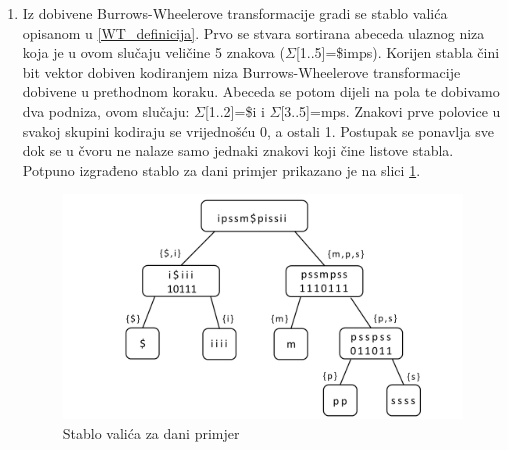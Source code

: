 \documentclass[a4paper,12pt]{article}
\begin{document}
\begin{enumerate}
	\item Iz dobivene Burrows-Wheelerove transformacije gradi se stablo valića opisanom u \ref{WT_definicija}. Prvo se stvara sortirana abeceda ulaznog niza koja je u ovom slučaju veličine 5 znakova ($\Sigma$[1..5]=\$imps). Korijen stabla čini bit vektor dobiven kodiranjem niza Burrows-Wheelerove transformacije dobivene u prethodnom koraku. Abeceda se potom dijeli na pola te dobivamo dva podniza, ovom slučaju: $\Sigma$[1..2]=\$i i $\Sigma$[3..5]=mps. Znakovi prve polovice u svakoj skupini kodiraju se vrijednošću 0, a ostali 1. Postupak se ponavlja sve dok se u čvoru ne nalaze samo jednaki znakovi koji čine listove stabla. Potpuno izgrađeno stablo za dani primjer prikazano je na slici \ref{fig:waveletTree}.

	\begin{figure}
		\begin{center}
			\includegraphics[width=\columnwidth]{waveletTree.png}
			\caption{Stablo valića za dani primjer}
			\label{fig:waveletTree}
		\end{center}
	\end{figure}



\end{enumerate}
\end{document}

